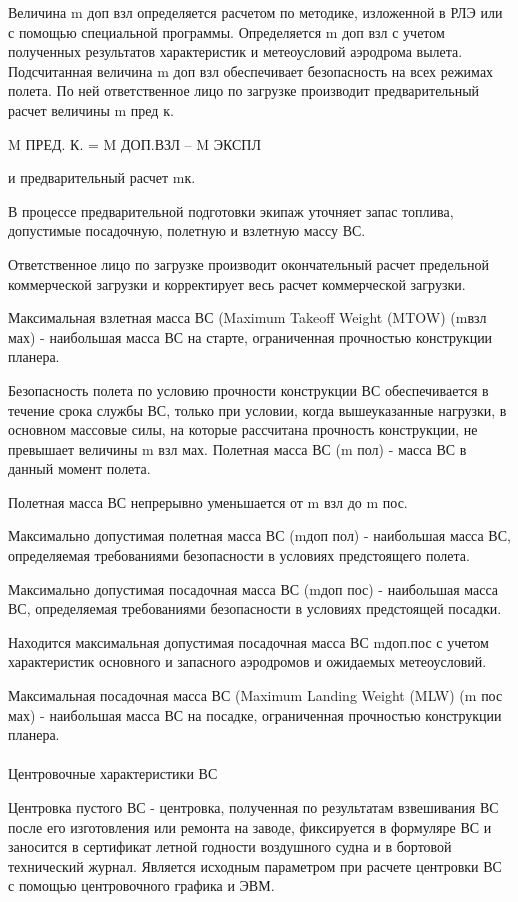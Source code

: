 Величина m доп взл определяется расчетом по методике, изложенной в РЛЭ или с помощью специальной программы.
Определяется m доп взл с учетом полученных результатов характеристик и метеоусловий аэродрома вылета. Подсчитанная величина m доп взл обеспечивает безопасность на всех режимах полета. По ней ответственное лицо по загрузке производит предварительный расчет величины m пред к. 

M ПРЕД. К. = M ДОП.ВЗЛ – M ЭКСПЛ

и предварительный расчет mк.

В процессе предварительной подготовки экипаж уточняет запас топлива, допустимые посадочную, полетную и взлетную массу ВС. 

Ответственное лицо по загрузке производит окончательный расчет предельной коммерческой загрузки и корректирует весь расчет коммерческой загрузки.

Максимальная взлетная масса ВС (Maximum Takeoff Weight (MTOW) (mвзл мах) - наибольшая масса ВС на старте, ограниченная прочностью конструкции планера.

Безопасность полета по условию прочности конструкции ВС обеспечивается в течение срока службы ВС, только при условии, когда вышеуказанные нагрузки, в основном массовые силы, на которые рассчитана прочность конструкции, не превышает величины m взл мах.
Полетная масса ВС (m пол) - масса ВС в данный момент полета.

Полетная масса ВС непрерывно уменьшается от m взл до m пос. 

Максимально допустимая полетная масса ВС (mдоп пол) - наибольшая масса ВС, определяемая требованиями безопасности в условиях предстоящего полета.

Максимально допустимая посадочная масса ВС (mдоп пос) - наибольшая масса ВС, определяемая требованиями безопасности в условиях предстоящей посадки.

Находится максимальная допустимая посадочная масса ВС mдоп.пос с учетом характеристик основного и запасного аэродромов и ожидаемых метеоусловий. 

Максимальная посадочная масса ВС (Maximum Landing Weight (MLW) (m пос мах) - наибольшая масса ВС на посадке, ограниченная прочностью конструкции планера.

\paragraph{} Центровочные характеристики ВС

Центровка пустого ВС - центровка, полученная по результатам взвешивания ВС после его изготовления или ремонта на заводе, фиксируется в формуляре ВС и заносится в сертификат летной годности воздушного судна и в бортовой технический журнал.
Является исходным параметром при расчете центровки ВС с помощью центровочного графика и ЭВМ.

